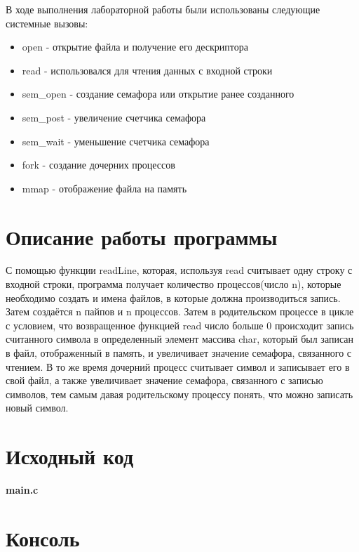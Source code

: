 \documentclass[a4paper, 12pt]{article}
\begin{document}
В ходе выполнения лабораторной работы были использованы следующие системные вызовы:

\begin{itemize}
	\item open - открытие файла и получение его дескриптора
	\item read - использовался для чтения данных с входной строки
	\item sem\_open - создание семафора или открытие ранее созданного
	\item sem\_post - увеличение счетчика семафора
	\item sem\_wait - уменьшение счетчика семафора
	\item fork - создание дочерних процессов
	\item mmap - отображение файла на память
\end{itemize}
\section{Описание работы программы}

С помощью функции readLine, которая, используя read считывает одну строку с входной строки, программа получает количество процессов(число n), которые необходимо создать и имена файлов, в которые должна производиться запись. Затем создаётся n пайпов и n процессов. Затем в родительском процессе в цикле с условием, что возвращенное функцией read число больше 0 происходит запись считанного символа в определенный элемент массива char, который был записан в файл, отображенный в память, и увеличивает значение семафора, связанного с чтением. В то же время дочерний процесс считывает символ и записывает его в свой файл, а также увеличивает значение семафора, связанного с записью символов, тем самым давая родительскому процессу понять, что можно записать новый символ.

\newpage

\section{Исходный код}

\textbf{\large{main.c}}

\newpage
\section{Консоль}
\end{document}

